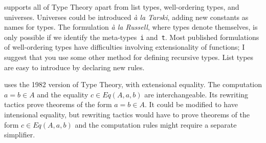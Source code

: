 {\CTT} supports all of Type Theory apart from list types, well-ordering
types, and universes.  Universes could be introduced {\em\`a la Tarski},
adding new constants as names for types.  The formulation {\em\`a la
  Russell}, where types denote themselves, is only possible if we identify
the meta-types~{\tt i} and~{\tt t}.  Most published formulations of
well-ordering types have difficulties involving extensionality of
functions; I suggest that you use some other method for defining recursive
types.  List types are easy to introduce by declaring new rules.

{\CTT} uses the 1982 version of Type Theory, with extensional equality.
The computation $a=b\in A$ and the equality $c\in Eq(A,a,b)$ are
interchangeable.  Its rewriting tactics prove theorems of the form $a=b\in
A$.  It could be modified to have intensional equality, but rewriting
tactics would have to prove theorems of the form $c\in Eq(A,a,b)$ and the
computation rules might require a separate simplifier.


